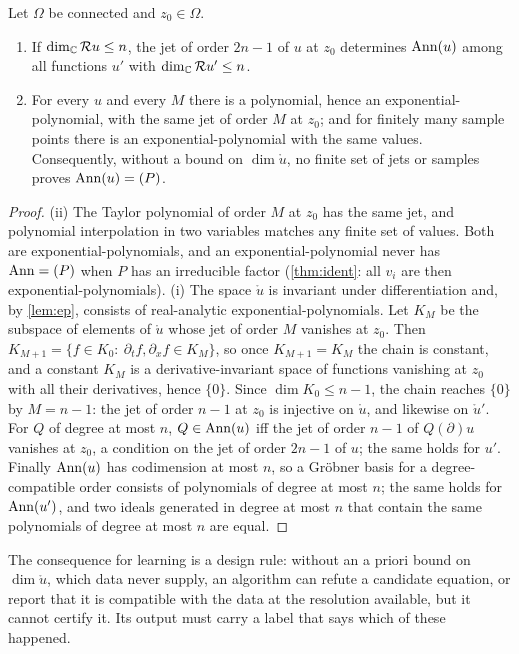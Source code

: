 \begin{proposition}\label{prop:certify}
Let $\Omega$ be connected and $z_0\in\Omega$.
\begin{enumerate}[label=(\roman*)]
  \item If $\dim_{\mathbb{C}}\mathcal{R} u\le n$, the jet of order $2n-1$ of $u$ at $z_0$ determines $\operatorname{Ann}(u)$ among all functions
  $u'$ with $\dim_{\mathbb{C}}\mathcal{R} u'\le n$.
  \item For every $u$ and every $M$ there is a polynomial, hence an exponential-polynomial, with the same jet of
  order $M$ at $z_0$; and for finitely many sample points there is an exponential-polynomial with the same values.
  Consequently, without a bound on $\dim\ring u$, no finite set of jets or samples proves $\operatorname{Ann}(u)=(P)$.
\end{enumerate}
\end{proposition}

\begin{proof}
(ii) The Taylor polynomial of order $M$ at $z_0$ has the same jet, and polynomial interpolation in two variables
matches any finite set of values. Both are exponential-polynomials, and an exponential-polynomial never has
$\operatorname{Ann}=(P)$ when $P$ has an irreducible factor (\cref{thm:ident}: all $v_i$ are then exponential-polynomials).
(i) The space $\ring u$ is invariant under differentiation and, by \cref{lem:ep}, consists of real-analytic
exponential-polynomials. Let $K_M$ be the subspace of elements of $\ring u$ whose jet of order $M$ vanishes at $z_0$.
Then $K_{M+1}=\{f\in K_0:\ \partial_tf,\partial_xf\in K_M\}$, so once $K_{M+1}=K_M$ the chain is constant, and a
constant $K_M$ is a derivative-invariant space of functions vanishing at $z_0$ with all their derivatives, hence
$\{0\}$. Since $\dim K_0\le n-1$, the chain reaches $\{0\}$ by $M=n-1$: the jet of order $n-1$ at $z_0$ is injective
on $\ring u$, and likewise on $\ring u'$. For $Q$ of degree at most $n$, $Q\in\operatorname{Ann}(u)$ iff the jet of order
$n-1$ of $Q(\partial)u$ vanishes at $z_0$, a condition on the jet of order $2n-1$ of $u$; the same holds for $u'$.
Finally $\operatorname{Ann}(u)$ has codimension at most $n$, so a Gr\"obner basis for a degree-compatible order consists of
polynomials of degree at most $n$; the same holds for $\operatorname{Ann}(u')$, and two ideals generated in degree at most $n$
that contain the same polynomials of degree at most $n$ are equal.
\end{proof}

The consequence for learning is a design rule: without an a priori bound on $\dim\ring u$, which data never
supply, an algorithm can refute a candidate equation, or report that it is compatible with the data at
the resolution available, but it cannot certify it. Its output must carry a label that says which of these
happened.
